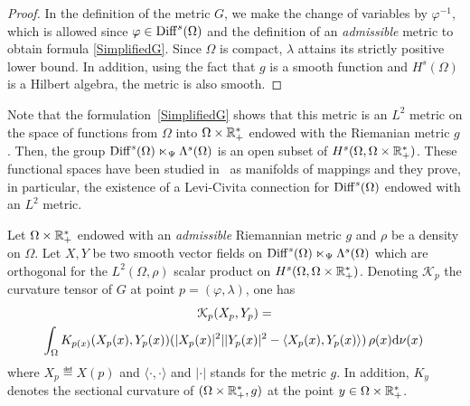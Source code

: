 \begin{proof}
In the definition of the metric $G$, we make the change of variables by $\varphi^{-1}$, which is allowed since $\varphi \in \operatorname{Diff}^{s}(\Omega)$ and the definition of an \textit{admissible} metric to obtain formula \eqref{SimplifiedG}.
Since $\Omega$ is compact, $\lambda$ attains its strictly positive lower bound. In addition, using the fact that $g$ is a smooth function and $H^s(\Omega)$ is a Hilbert algebra, the metric is also smooth.
\end{proof}



Note that the formulation~\eqref{SimplifiedG} shows that this metric is an $L^2$ metric on the space of functions from $\Omega$ into $\Omega \times \mathbb{R}_+^*$ endowed with the Riemanian metric $g$. Then, the group $\operatorname{Diff}^{s}(\Omega) \ltimes_\Psi \Lambda^s(\Omega)$ is an open subset of $H^s(\Omega, \Omega \times \mathbb{R}_+^*)$.
These functional spaces have been studied in~\cite{em70} as manifolds of mappings and they prove, in particular, the existence of a Levi-Civita connection for $\operatorname{Diff}^{s}(\Omega)$ endowed with an $L^2$ metric.

\begin{theorem}\label{SectionalCurvature}
Let $\Omega \times \mathbb{R}_+^*$ endowed with an \textit{admissible} Riemannian metric $g$ and $\rho$ be a density on $\Omega$. Let $X,Y$ be two smooth vector fields on $\operatorname{Diff}^{s}(\Omega) \ltimes_\Psi \Lambda^s(\Omega)$ which are orthogonal for the $L^2(\Omega,\rho)$ scalar product on $H^s(\Omega, \Omega \times \mathbb{R}_+^*)$. Denoting $\mathcal{K}_{p}$ the curvature tensor of $G$ at point $p=(\varphi,\lambda)$, one has
\begin{multline}\label{eq:SectionalCurvature}
\mathcal{K}_{p}(X_p,Y_p) = \\ \int_\Omega K_{p(x)}(X_p(x),Y_p(x)) (|X_p(x)|^2| |Y_p(x)|^2 - \langle X_p(x) , Y_p(x) \rangle) \, \rho(x) \mathrm{d} \nu(x) \,
\end{multline}
where  $X_p \eqdef X(p)$ and $\langle \cdot , \cdot \rangle $ and $| \cdot |$ stands for the metric $g$. In addition, $K_y$ denotes the sectional curvature of $(\Omega \times \mathbb{R}_+^*,g)$ at the point $y \in \Omega \times \mathbb{R}_+^*$.
\end{theorem}


